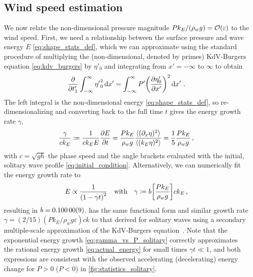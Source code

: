 \documentclass{jfm}
\renewcommand*{\epsilon}{\varepsilon}
\begin{document}
\subsection{\label{sec:press_mag} Wind speed estimation}
We now relate the non-dimensional pressure magnitude $P k_E/(\rho_w g) =
\order{\epsilon}$ to the wind speed.
First, we need a relationship between the surface pressure and wave
energy $E$ \cref{eq:shape_stats_def}, which we can approximate using the
standard procedure \citep[\eg][]{mei2005nonlinear} of multiplying the
(non-dimensional, denoted by primes) KdV-Burgers equation
\cref{eq:kdv_burgers} by $\eta'_0$ and integrating from $x'=-\infty$ to
$\infty$ to obtain
\begin{equation}
  \pdv{t'_1} \int_{-\infty}^{\infty} {\eta'}_0^2 \dd{x'}
  = \int_{-\infty}^{\infty} P' \pqty{\pdv{\eta'_0}{x'}}^2
  \dd{x'} \,.
\end{equation}
The left integral is the non-dimensional energy
\cref{eq:shape_stats_def}, so re-dimensionalizing and converting back to
the full time $t$ gives the energy growth rate $\gamma$,
\begin{equation}
  \frac{\gamma}{c k_E} \coloneqq
  \frac{1}{c k_E E} \pdv{E}{t}
  = \frac{P k_E}{\rho_w g} \frac{\langle (\partial_x \eta)^2 \rangle}
    {\langle (k_E \eta)^2 \rangle}
  = \frac{1}{5} \frac{P k_E}{\rho_w g}
  \,,
  \label{eq:gamma_vs_P_solitary}
\end{equation}
with $c = \sqrt{gh}$ the phase speed and the angle brackets evaluated
with the initial, solitary wave profile \cref{eq:initial_condition}.
Alternatively, we can numerically fit the energy growth rate to
\begin{equation}
  E \propto \frac{1}{\pqty{1 - \gamma t}^2}
  \qq{with}
  \gamma \coloneqq b \bqty{\frac{P k_E}{\rho_w g}} c k_E
  \,,
  \label{eq:actual_energy}
\end{equation}
resulting in $b = \num{0.10000 \pm 0.00009}$.
 has the same functional form and similar growth
rate $\gamma = (2/15) (P k_E/\rho_w g \epsilon) ck$ to that derived for
solitary waves using a secondary multiple-scale approximation of the
KdV-Burgers equation~\citep{zdyrski2019effects}.
Note that the exponential energy growth \cref{eq:gamma_vs_P_solitary}
correctly approximates the rational energy growth
\cref{eq:actual_energy} for small times $\gamma t \ll 1$,
and both expressions are consistent with the observed accelerating
(decelerating) energy change for $P>0$ ($P<0$) in
\cref{fig:statistics_solitary}.
\end{document}
